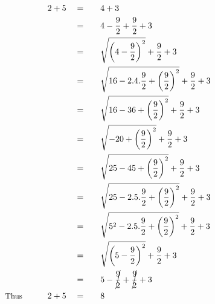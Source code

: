 \begin{alignat*}{5}
&\,&2+5\quad&=\quad&&4+3\\
&\,&\,&=&&4-\frac{9}{2}+\frac{9}{2}+3\\
&\,&\,&=&&\sqrt{\left(4-\frac{9}{2}\right)^2}+\frac{9}{2}+3\\
&\,&\,&=&&\sqrt{16-2.4.\frac{9}{2}+\left(\frac{9}{2}\right)^2}+\frac{9}{2}+3\\
&\,&\,&=&&\sqrt{16-36+\left(\frac{9}{2}\right)^2}+\frac{9}{2}+3\\
&\,&\,&=&&\sqrt{-20+\left(\frac{9}{2}\right)^2}+\frac{9}{2}+3\\
&\,&\,&=&&\sqrt{25-45+\left(\frac{9}{2}\right)^2}+\frac{9}{2}+3\\
&\,&\,&=&&\sqrt{25-2.5.\frac{9}{2}+\left(\frac{9}{2}\right)^2}+\frac{9}{2}+3\\
&\,&\,&=&&\sqrt{5^2-2.5.\frac{9}{2}+\left(\frac{9}{2}\right)^2}+\frac{9}{2}+3\\
&\,&\,&=&&\sqrt{\left(5-\frac{9}{2}\right)^2}+\frac{9}{2}+3\\
&\,&\,&=&&5-\cancel{\frac{9}{2}}+\cancel{\frac{9}{2}}+3\\
&\small\text{Thus}\normalsize\qquad&2+5\quad&=&&8
\end{alignat*}

